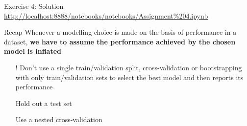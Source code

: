 \documentclass{beamer}
\begin{document}
    \begin{frame}{Exercise 4: Solution}
        \centering
        \vfill
        \scriptsize{\url{http://localhost:8888/notebooks/notebooks/Assignment\%204.ipynb}}
        \vfill
    \end{frame}

    \begin{frame}{Recap}
        Whenever a modelling choice is made on the basis of
        performance in a dataset, \textbf{we have to assume the
        performance achieved by the chosen model is inflated}
        \begin{itemize}
            \item[!] Don't use a single train/validation split, cross-validation or bootstrapping with only train/validation sets to select the best model and then reports its performance
            \item[\textrightarrow] Hold out a test set
            \item[\textrightarrow] Use a nested cross-validation
        \end{itemize}
    \end{frame}

    
    
    
\end{document}
